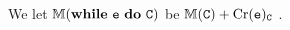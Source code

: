 \documentclass[conference]{IEEEtran}
\newcommand{\vi}{\usym{1F322}} %
\newcommand{\nv}{\cdot} %
\begin{document}





\begin{definition}%
	We let \(\sfm{\textnormal{\prc|while| $\comm{e}$ \prc|do| $\comm{C}$}}\) be \(\mathbb{M}(\mathtt{C}) + \mathrm{Cr}(\mathtt{e})_{\mathtt{C}}\)%
	.
\end{definition}
\end{document}
